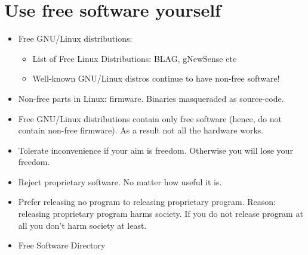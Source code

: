 \documentclass[twoside,openright]{report}
\begin{document}
\section{Use free software yourself}
\begin{itemize}
 \item     Free GNU/Linux distributions:
\begin{itemize}
 \item         List of Free Linux Distributions: BLAG, gNewSense etc
 \item         Well-known GNU/Linux distros continue to have non-free software!
\end{itemize}
 \item     Non-free parts in Linux: firmware. Binaries masqueraded as source-code.
 \item     Free GNU/Linux distributions contain only free software (hence, do not contain non-free firmware). As a result not all the hardware works. 
 \item     Tolerate inconvenience if your aim is freedom. Otherwise you will lose your freedom.
 \item     Reject proprietary software. No matter how useful it is.
 \item     Prefer releasing no program to releasing proprietary program. Reason: releasing proprietary program harms society. If you do not release program at all you don't harm society at least.
 \item     Free Software Directory
\end{itemize}
\end{document}
